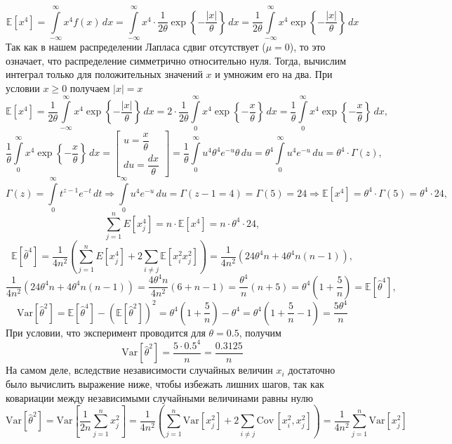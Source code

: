 \documentclass[a4paper, 12pt]{article}
\begin{document}
    $$\mathbb{E}\left[x^4\right]=\int\limits_{-\infty}^{\infty}x^4f(x)\,dx=\int\limits_{-\infty}^{\infty}x^4\cdot\dfrac{1}{2\theta}\exp{\left\{-\dfrac{|x|}{\theta}\right\}}\,dx=\dfrac{1}{2\theta}\int\limits_{-\infty}^{\infty}x^4\exp{\left\{-\dfrac{|x|}{\theta}\right\}}\,dx$$
    Так как в нашем распределении Лапласа сдвиг отсутствует ($\mu=0$), то это означает, что распределение симметрично относительно нуля. Тогда, вычислим интеграл только для
    положительных значений $x$ и умножим его на два. При условии $x\geq0$ получаем $|x|=x$
    $$\mathbb{E}\left[x^4\right]=\dfrac{1}{2\theta}\int\limits_{-\infty}^{\infty}x^4\exp{\left\{-\dfrac{|x|}{\theta}\right\}}\,dx=2\cdot\dfrac{1}{2\theta}\int\limits_{0}^{\infty}x^4\exp{\left\{-\dfrac{x}{\theta}\right\}}\,dx=
    \dfrac{1}{\theta}\int\limits_{0}^{\infty}x^4\exp{\left\{-\dfrac{x}{\theta}\right\}}\,dx,$$
    $$\dfrac{1}{\theta}\int\limits_{0}^{\infty}x^4\exp{\left\{-\dfrac{x}{\theta}\right\}}\,dx=
    \begin{bmatrix}
        u=\dfrac{x}{\theta}\\
        du=\dfrac{dx}{\theta}
    \end{bmatrix}=
    \dfrac{1}{\theta}\int\limits_{0}^{\infty}u^4\theta^4e^{-u}\theta\,du=\theta^4\int\limits_{0}^{\infty}u^4e^{-u}\,du=\theta^4\cdot\Gamma{(z)},$$
    $$\Gamma{(z)}=\int\limits_{0}^{\infty}t^{z-1}e^{-t}\,dt\Rightarrow\int\limits_{0}^{\infty}u^4e^{-u}\,du=\Gamma{(z-1=4)}=\Gamma{(5)}=24\Rightarrow\mathbb{E}\left[x^4\right]=\theta^4\cdot\Gamma{(5)}=\theta^4\cdot24,$$
    $$\sum\limits_{j=1}^{n}E\left[x_j^4\right]=n\cdot\mathbb{E}\left[x^4\right]=n\cdot\theta^4\cdot24,$$
    $$\mathbb{E}\left[\hat{\theta}^4\right]=\dfrac{1}{4n^2}\left(\sum\limits_{j=1}^{n}E\left[x_j^4\right]+2\sum\limits_{i\neq{j}}\mathbb{E}\left[x_i^2x_j^2\right]\right)=
    \dfrac{1}{4n^2}\left(24\theta^4n+4\theta^4n\left(n-1\right)\right),$$
    $$\dfrac{1}{4n^2}\left(24\theta^4n+4\theta^4n\left(n-1\right)\right)=\dfrac{4\theta^4n}{4n^2}\left(6+n-1\right)=\dfrac{\theta^4}{n}\left(n+5\right)=\theta^4\left(1+\dfrac{5}{n}\right)=\mathbb{E}\left[\hat{\theta}^4\right],$$
    $$\text{Var}{\left[\hat{\theta}^2\right]}=\mathbb{E}\left[\hat{\theta}^4\right]-\left(\mathbb{E}\left[\hat{\theta}^2\right]\right)^2=
    \theta^4\left(1+\dfrac{5}{n}\right)-\theta^4=\theta^4\left(1+\dfrac{5}{n}-1\right)=\dfrac{5\theta^4}{n}$$
    При условии, что эксперимент проводится для $\theta=0.5$, получим
    $$\text{Var}{\left[\hat{\theta}^2\right]}=\dfrac{5\cdot0.5^4}{n}=\dfrac{0.3125}{n}$$
    На самом деле, вследствие независимости случайных величин $x_i$ достаточно было вычислить выражение ниже, чтобы избежать лишних шагов, так как ковариации между независимыми случайными величинами равны нулю
    $$\text{Var}{\left[\hat{\theta}^2\right]}=\text{Var}{\left[\dfrac{1}{2n}\sum\limits_{j=1}^{n}x_j^2\right]}=\dfrac{1}{4n^2}\left(\sum\limits_{j=1}^{n}\text{Var}\left[x_{j}^2\right]+2\sum\limits_{i\neq{j}}\text{Cov}\,\left[x_i^2,x_j^2\right]\right)=\dfrac{1}{4n^2}\sum\limits_{j=1}^{n}\text{Var}\left[x_{j}^2\right]$$
\end{document}

